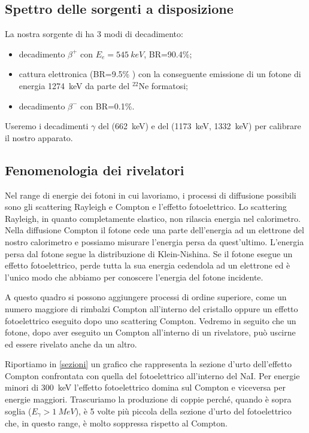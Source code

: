 \subsection{Spettro delle sorgenti a disposizione}

La nostra sorgente di \na{} ha 3 modi di decadimento:
\begin{itemize}
\item decadimento $\beta^+$ con $E_e=\SI{545}{keV}$, BR=90.4\%;
\item cattura elettronica (BR=9.5\% ) con la conseguente emissione di un fotone di energia \SI{1274}{keV} da parte del $^{22}$Ne formatosi;
\item decadimento $\beta^-$ con BR=0.1\%.
\end{itemize}

Useremo i decadimenti $\gamma$ del \cs{} (\SI{662}{keV}) e del \co{} (\SI{1173}{keV}, \SI{1332}{keV}) per calibrare il nostro apparato.

\subsection{Fenomenologia dei rivelatori}


Nel range di energie dei fotoni in cui lavoriamo, i processi di diffusione possibili sono gli scattering Rayleigh e Compton e l'effetto fotoelettrico.
Lo scattering Rayleigh, in quanto completamente elastico, non rilascia energia nel calorimetro.
Nella diffusione Compton il fotone cede una parte dell'energia ad un elettrone del nostro calorimetro e possiamo misurare l'energia persa da quest'ultimo. L'energia persa dal fotone segue la distribuzione di Klein-Nishina.
Se il fotone esegue un effetto fotoelettrico, perde tutta la sua energia cedendola ad un elettrone ed è l'unico modo che abbiamo per conoscere l'energia del fotone incidente.

A questo quadro si possono aggiungere processi di ordine superiore, come un numero maggiore di rimbalzi Compton all'interno del cristallo oppure un effetto fotoelettrico eseguito dopo uno scattering Compton.
Vedremo in seguito che un fotone, dopo aver eseguito un Compton all'interno di un rivelatore, può uscirne ed essere rivelato anche da un altro.

Riportiamo in \autoref{sezioni} un grafico che rappresenta la sezione d'urto dell'effetto Compton confrontata con quella del fotoelettrico all'interno del NaI. Per energie minori di \SI{300}{keV} l'effetto fotoelettrico domina sul Compton e viceversa per energie maggiori.
Trascuriamo la produzione di coppie perché, quando è sopra soglia ($E_{\gamma}>\SI{1}{MeV}$), è 5 volte più piccola della sezione d'urto del fotoelettrico che, in questo range, è molto soppressa rispetto al Compton.

